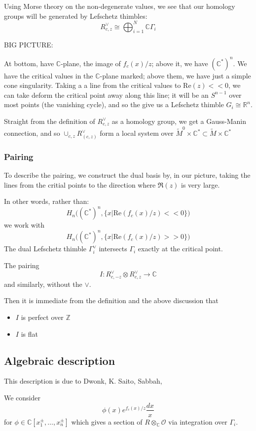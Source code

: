 \documentclass{amsart}
\theoremstyle{definition}
\newcommand{\Z}{\mathbb{Z}}
\newcommand{\R}{\mathbb{R}}
\newcommand{\OO}{\mathcal{O}}
\newcommand{\C}{\mathbb{C}}
\begin{document}
Using Morse theory on the non-degenerate values, we see that our homology groups will be generated by Lefschetz thimbles:
$$R^\vee_{c,z}\cong\bigoplus_{i=1}^N \C \Gamma_i$$

BIG PICTURE:


At bottom, have $\C$-plane, the image of $f_c(x)/z$; above it, we have $(\C^*)^n$.  We have the critical values in the $\C$-plane marked; above them, we have just a simple cone singularity.  Taking a a line from the critical values to $\text{Re}(z)<<0$, we can take deform the critical point away along this line; it will be an $S^{n-1}$ over most points (the vanishing cycle), and so the give us a Lefschetz thimble $G_i\cong \R^n$.

Straight from the definition of $R^\vee_{c,z}$ as a homology group, we get a Gauss-Manin connection, and so $\cup_{c,z} R^\vee_{(c,z)}$ form a local system over
$\tilde{M}^0\times\C^*\subset \tilde{M}\times\C^*$


\subsubsection{Pairing}

To describe the pairing, we construct the dual basis by, in our picture, taking the lines from the critial points to the direction where $\Re(z)$ is very large.

In other words, rather than:
$$H_n\Big((\C^*)^n,\big\{x\big|\text{Re}(f_c(x)/z)<<0\big\}\Big)$$
we work with
$$H_n\Big((\C^*)^n,\big\{x\big|\text{Re}(f_c(x)/z)>>0 \big\}\Big)$$
The dual Lefschetz thimble $\Gamma^\vee_i$ intersects $\Gamma_i$ exactly at the critical point.

The pairing 
$$I:R^\vee_{c,-z}\otimes R^\vee_{c,z}\to\C$$
and similarly, without the  $\vee$.  

Then it is immediate from the definition and the above discussion that
\begin{itemize}
\item $I$ is perfect over $\Z$
\item $I$ is flat
\end{itemize}

\subsection{Algebraic description}
This description is due to Dwonk, K. Saito, Sabbah,

We consider
$$\phi(x)e^{f_c(x)/z}\frac{dx}{x}$$
for $\phi\in\C[x_1^\pm,\dots, x_n^\pm]$
which gives a section of $R\otimes_\C\OO$ via integration over $\Gamma_i$.
\end{document}
